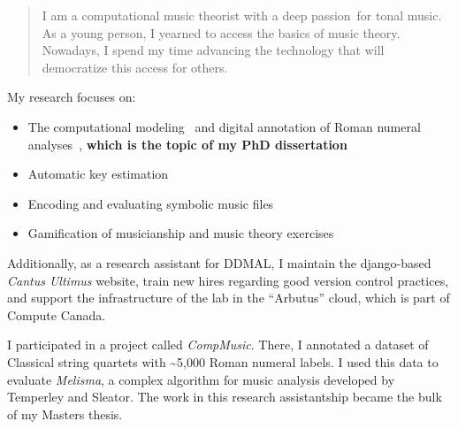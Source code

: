 \documentclass[10pt,a4paper,ragged2e,withhyper]{altacv}
\begin{document}
\begin{paracol}{2}

\begin{quote}
I am a computational music theorist with a deep passion~for tonal music.
As a young person, I yearned to access the basics of music theory.
Nowadays, I spend my time advancing the technology that will democratize this access for others.
\end{quote}


My research focuses on:
\begin{itemize}
    \item The computational modeling~\parencite{napoles_lopez_augmentednet_2021} and digital annotation of Roman numeral analyses~\parencite{napoles_lopez_harmalysis_2020}, \textbf{which is the topic of my PhD dissertation}
    \item Automatic key estimation \cite{napoles_lopez_key-finding_2019, napoles_lopez_local_2020}
    \item Encoding and evaluating symbolic music files \parencite{degroot-maggetti_data_2020, napoles_lopez_harmonic_2020, napoles_lopez_encoding_2018, napoles_lopez_effects_2019}
    \item Gamification of musicianship and music theory exercises \parencite{napoles_lopez_-re-myth_2020, napoles_lopez_dandelot_2019}
\end{itemize}

Additionally, as a research assistant for DDMAL, I maintain the django-based \emph{Cantus Ultimus} website, train new hires regarding good version control practices, and support the infrastructure of the lab in the ``Arbutus'' cloud, which is part of Compute Canada.

\medskip

I participated in a project called \emph{CompMusic}.
There, I annotated a dataset of Classical string quartets with \textasciitilde{}5,000 Roman numeral labels. 
I used this data to evaluate \emph{Melisma}, a complex algorithm for music analysis developed by Temperley and Sleator.
The work in this research assistantship became the bulk of my Masters thesis.


\end{paracol}
\end{document}
